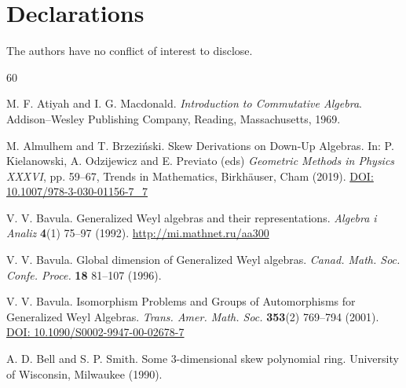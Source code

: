 \documentclass{amsart}
\theoremstyle{definition}
\theoremstyle{remark}
\numberwithin{equation}{section}
\begin{document}
\section{Declarations}

The authors have no conflict of interest to disclose.


\begin{thebibliography}{60}

 M. F. Atiyah and I. G. Macdonald. {\em Introduction to Commutative Algebra}. Addison--Wesley Publishing Company, Reading, Massachusetts, 1969.

 M. Almulhem and T. Brzezi\'nski. Skew Derivations on Down-Up Algebras. In: P. Kielanowski, A. Odzijewicz and E. Previato (eds) {\em Geometric Methods in Physics XXXVI}, pp. 59--67, Trends in Mathematics, Birkh\"auser, Cham (2019). \href{https://link.springer.com/chapter/10.1007/978-3-030-01156-7_7}{DOI: 10.1007/978-3-030-01156-7\_7}

 V. V. Bavula. Generalized Weyl algebras and their representations. {\em Algebra i Analiz} {\bf 4}(1) 75--97 (1992). \href{http://mi.mathnet.ru/aa300}{http://mi.mathnet.ru/aa300}

 V. V. Bavula. Global dimension of Generalized Weyl algebras. {\em Canad. Math. Soc. Confe. Proce.} {\bf 18} 81--107 (1996).

 V. V. Bavula. Isomorphism Problems and Groups of Automorphisms for Generalized Weyl Algebras. {\em Trans. Amer. Math. Soc.} {\bf 353}(2) 769--794 (2001). \href{https://pubs.ams.org/journals/tran/2001-353-02/S0002-9947-00-02678-7}{DOI: 10.1090/S0002-9947-00-02678-7}



 A. D. Bell and S. P. Smith. Some 3-dimensional skew polynomial ring. University of Wisconsin, Milwaukee (1990).


\end{thebibliography}
\end{document}
